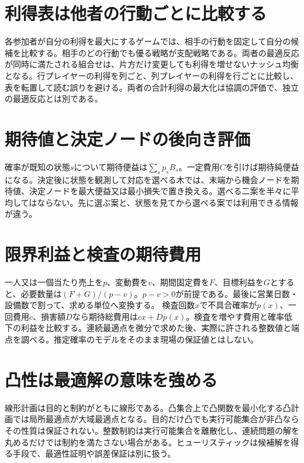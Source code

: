 \section{利得表は他者の行動ごとに比較する}
\label{theory:design:game}
各参加者が自分の利得を最大にするゲームでは、相手の行動を固定して自分の候補を比較する。相手のどの行動でも優る戦略が支配戦略である。両者の最適反応が同時に満たされる組合せは、片方だけ変更しても利得を増せないナッシュ均衡となる。行プレイヤーの利得を列ごと、列プレイヤーの利得を行ごとに比較し、表を転置して読む誤りを避ける。両者の合計利得の最大化は協調の評価で、独立の最適反応とは別である。

\section{期待値と決定ノードの後向き評価}
\label{theory:design:decision}
確率が既知の状態\(s\)について期待便益は\(\sum_s p_s B_s\)。一定費用\(C\)を引けば期待純便益になる。決定後に状態を観測して対応を選べる木では、末端から機会ノードを期待値、決定ノードを最大便益又は最小損失で置き換える。選べる二案を半々に平均してはならない。先に選ぶ案と、状態を見てから選べる案では利用できる情報が違う。

\section{限界利益と検査の期待費用}
\label{theory:design:economics}
一人又は一個当たり売上を\(p\)、変動費を\(v\)、期間固定費を\(F\)、目標利益を\(G\)とすると、必要数量は\((F+G)/(p-v)\)。\(p-v>0\)が前提である。最後に営業日数・設備数で割って、求める単位へ変換する。
\label{theory:design:inspection}
検査回数\(x\)で不具合確率が\(p(x)\)、一回費用\(c\)、損害額\(D\)なら期待総費用は\(cx+Dp(x)\)。検査を増やす費用と確率低下の利益を比較する。連続最適点を微分で求めた後、実際に許される整数値と端点を調べる。推定確率のモデルをそのまま現場の保証値とはしない。

\section{凸性は最適解の意味を強める}
\label{theory:design:convex}
線形計画は目的と制約がともに線形である。凸集合上で凸関数を最小化する凸計画では局所最適点が大域最適点となる\autocite{finish56_convex}。目的だけ凸でも実行可能集合が非凸ならその性質は保証されない。整数制約は実行可能集合を離散化し、連続問題の解を丸めるだけでは制約を満たさない場合がある。ヒューリスティックは候補解を得る手段で、最適性証明や誤差保証は別に扱う。

